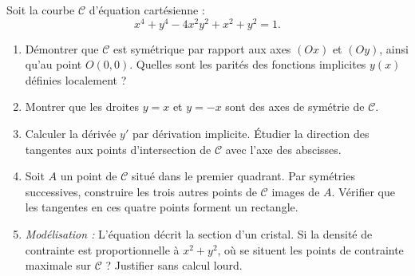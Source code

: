 \documentclass[11pt]{article}
\begin{document}
\begin{exercice}
Soit la courbe $\mathcal{C}$ d'équation cartésienne :
\[
x^4 + y^4 - 4x^2y^2 + x^2 + y^2 = 1.
\]
\begin{enumerate}
    \item Démontrer que $\mathcal{C}$ est symétrique par rapport aux axes $(Ox)$ et $(Oy)$, ainsi qu'au point $O(0,0)$. Quelles sont les parités des fonctions implicites $y(x)$ définies localement ?
    \item Montrer que les droites $y=x$ et $y=-x$ sont des axes de symétrie de $\mathcal{C}$.
    \item Calculer la dérivée $y'$ par dérivation implicite. Étudier la direction des tangentes aux points d'intersection de $\mathcal{C}$ avec l'axe des abscisses.
    \item Soit $A$ un point de $\mathcal{C}$ situé dans le premier quadrant. Par symétries successives, construire les trois autres points de $\mathcal{C}$ images de $A$. Vérifier que les tangentes en ces quatre points forment un rectangle.
    \item \textit{Modélisation :} L'équation décrit la section d'un cristal. Si la densité de contrainte est proportionnelle à $x^2+y^2$, où se situent les points de contrainte maximale sur $\mathcal{C}$ ? Justifier sans calcul lourd.
\end{enumerate}
\end{exercice}
\end{document}
